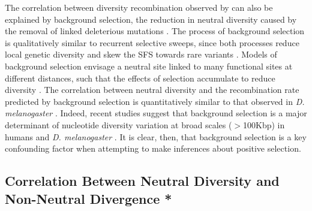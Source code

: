 The correlation between diversity recombination observed by \cite{RN114} can also be explained by background selection, the reduction in neutral diversity caused by the removal of linked deleterious mutations \citep{RN132}. The process of background selection is qualitatively similar to recurrent selective sweeps, since both processes reduce local genetic diversity \citep{RN110} and skew the SFS towards rare variants \citep{RN287,RN133}. Models of background selection envisage a neutral site linked to many functional sites at different distances, such that the effects of selection accumulate to reduce diversity \citep{RN206, RN157}. The correlation between neutral diversity and the recombination rate predicted by background selection is quantitatively similar to that observed in \emph{D. melanogaster} \citep{RN281}. Indeed, recent studies suggest that background selection is a major determinant of nucleotide diversity variation at broad scales ($>$100Kbp) in humans \cite{RN120} and \emph{D. melanogaster} \citep{RN288, RN116}. It is clear, then, that background selection is a key confounding factor when attempting to make inferences about positive selection.
 
\subsection[Using models of selective sweeps to estimate positive selection parameters]{Correlation Between Neutral Diversity and Non-Neutral Divergence *}

